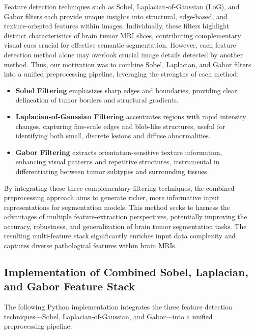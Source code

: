 Feature detection techniques such as Sobel, Laplacian-of-Gaussian (LoG), and Gabor filters each provide unique insights into structural, edge-based, and texture-oriented features within images. Individually, these filters highlight distinct characteristics of brain tumor MRI slices, contributing complementary visual cues crucial for effective semantic segmentation. However, each feature detection method alone may overlook crucial image details detected by another method. Thus, our motivation was to combine Sobel, Laplacian, and Gabor filters into a unified preprocessing pipeline, leveraging the strengths of each method:

\begin{itemize}
\item \textbf{Sobel Filtering} emphasizes sharp edges and boundaries, providing clear delineation of tumor borders and structural gradients.
\item \textbf{Laplacian-of-Gaussian Filtering} accentuates regions with rapid intensity changes, capturing fine-scale edges and blob-like structures, useful for identifying both small, discrete lesions and diffuse abnormalities.
\item \textbf{Gabor Filtering} extracts orientation-sensitive texture information, enhancing visual patterns and repetitive structures, instrumental in differentiating between tumor subtypes and surrounding tissues.
\end{itemize}

By integrating these three complementary filtering techniques, the combined preprocessing approach aims to generate richer, more informative input representations for segmentation models. This method seeks to harness the advantages of multiple feature-extraction perspectives, potentially improving the accuracy, robustness, and generalization of brain tumor segmentation tasks. The resulting multi-feature stack significantly enriches input data complexity and captures diverse pathological features within brain MRIs.

\subsection{Implementation of Combined Sobel, Laplacian, and Gabor Feature Stack}

The following Python implementation integrates the three feature detection techniques—Sobel, Laplacian-of-Gaussian, and Gabor—into a unified preprocessing pipeline:

